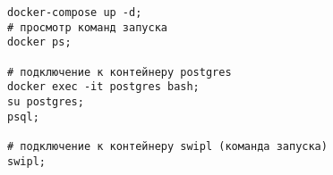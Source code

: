  \label{appendix:b}

\setcounter{figure}{1}
\makeatletter 
\renewcommand{\thelstlisting}{Б.\@arabic\c@figure}
\makeatother



\begin{lstlisting}[label=lst:docker_deploy, numbers=none, basicstyle=\normalsize, caption=Сценарий запуска контейнеров с базами данных]
docker-compose up -d;
# просмотр команд запуска
docker ps;

# подключение к контейнеру postgres
docker exec -it postgres bash;
su postgres;
psql;

# подключение к контейнеру swipl (команда запуска)
swipl;
\end{lstlisting}